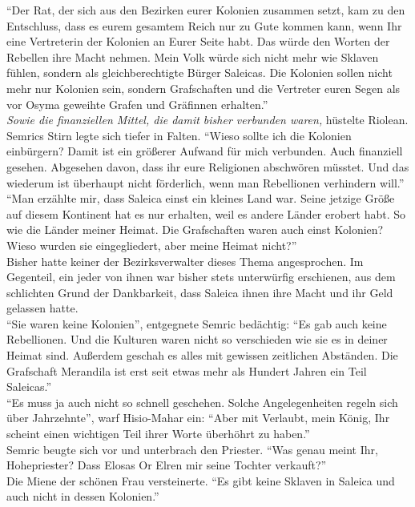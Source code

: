 ``Der Rat, der sich aus den Bezirken eurer Kolonien zusammen setzt, kam zu den Entschluss, dass es 
eurem gesamtem Reich nur zu Gute kommen kann, wenn Ihr eine Vertreterin der Kolonien an Eurer Seite 
habt. Das würde den Worten der Rebellen ihre Macht nehmen. Mein Volk würde sich nicht mehr wie 
Sklaven fühlen, sondern als gleichberechtigte Bürger Saleicas. Die Kolonien sollen nicht mehr nur 
Kolonien sein, sondern Grafschaften und die Vertreter euren Segen als vor Osyma geweihte Grafen und 
Gräfinnen erhalten.''\\
\textit{Sowie die finanziellen Mittel, die damit bisher verbunden waren,} hüstelte Riolean.\\
Semrics Stirn legte sich tiefer in Falten. ``Wieso sollte ich die Kolonien einbürgern? Damit ist 
ein größerer Aufwand für mich verbunden. Auch finanziell gesehen. Abgesehen davon, dass ihr eure 
Religionen abschwören müsstet. Und das wiederum ist überhaupt nicht förderlich, wenn man 
Rebellionen verhindern will.''\\
``Man erzählte mir, dass Saleica einst ein kleines Land war. Seine jetzige Größe auf diesem 
Kontinent hat es nur erhalten, weil es andere Länder erobert habt. So wie die Länder meiner Heimat. 
Die Grafschaften waren auch einst Kolonien? Wieso wurden sie eingegliedert, aber meine Heimat 
nicht?''\\
Bisher hatte keiner der Bezirksverwalter dieses Thema angesprochen. Im Gegenteil, ein jeder von 
ihnen war bisher stets unterwürfig erschienen, aus dem schlichten Grund der Dankbarkeit, dass 
Saleica ihnen ihre Macht und ihr Geld gelassen hatte.\\
``Sie waren keine Kolonien'', entgegnete Semric bedächtig: ``Es gab auch keine Rebellionen. Und die 
Kulturen waren nicht so verschieden wie sie es in deiner Heimat sind. Außerdem geschah es alles mit 
gewissen zeitlichen Abständen. Die Grafschaft Merandila ist erst seit etwas mehr als Hundert Jahren 
ein Teil Saleicas.''\\
``Es muss ja auch nicht so schnell geschehen. Solche Angelegenheiten regeln sich über Jahrzehnte'', 
warf Hisio-Mahar ein: ``Aber mit Verlaubt, mein König, Ihr scheint einen wichtigen Teil ihrer Worte 
überhöhrt zu haben.''\\
Semric beugte sich vor und unterbrach den Priester. ``Was genau meint Ihr, Hohepriester? Dass 
Elosas Or Elren mir seine Tochter verkauft?''\\
Die Miene der schönen Frau versteinerte. ``Es gibt keine Sklaven in Saleica und auch nicht in 
dessen Kolonien.''\\
